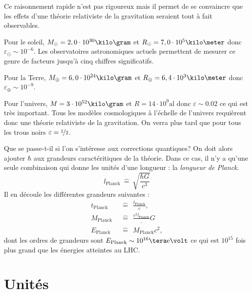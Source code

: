         Ce raisonnement rapide n'est pas rigoureux mais il permet de se convaincre que les effets d'une théorie relativiste de la gravitation seraient tout à fait observables. 
        \begin{exmp}
            Pour le soleil, $M_\odot = 2,0\cdot10^{30}\kilo\gram$ et $R_\odot = 7,0\cdot10^{5}\kilo\meter$ donc $\varepsilon_\odot \sim 10^{-6}$.
            Les observatoires astronomiques actuels permettent de mesurer ce genre de facteurs jusqu'à cinq chiffres significatifs. 
        \end{exmp}
        \begin{exmp}
            Pour la Terre, $M_\oplus= 6,0\cdot10^{24}\kilo\gram$ et $R_\oplus = 6,4\cdot10^{3}\kilo\meter$ donc $ \varepsilon_\oplus\sim 10^{-9}$.
        \end{exmp}
        \begin{exmp}
            Pour l'univers, $M = 3\cdot10^{52}\kilo\gram$ et $R = 14\cdot10^{9}\text{al}$ donc $ \varepsilon\sim 0.02$
            ce qui est très important. Tous les modèles cosmologiques à l'échelle de l'univers requièrent donc une théorie relativiste de la gravitation. On verra plus tard que pour tous les trous noirs $\varepsilon = \nicefrac{1}{2}$.
        \end{exmp}
        
        Que se passe-t-il si l'on s'intéresse aux corrections quantiques? On doit alors ajouter $\hbar$ aux grandeurs caractéritiques de la théorie. Dans ce cas, il n'y a qu'une seule combinaison qui donne les unités d'une longueur : la \textit{longueur de Planck}.
        \begin{equation*}
            l_{\text{Planck}} ~\hat{=}~ \sqrt{\frac{\hbar G}{c^3}}
        \end{equation*}
        Il en découle les différentes grandeurs suivantes :
        \begin{align*}
            t_{\text{Planck}} ~&~\hat{=}~~ \frac{l_{\text{Planck}}}{c}, \\
            M_{\text{Planck}} ~&~\hat{=}~~ \frac{c^2l_{\text{Planck}}},{G} \\
            E_{\text{Planck}} ~&~\hat{=}~~ M_{\text{Planck}}c^2,
        \end{align*}
        dont les ordres de grandeurs sont $E_{\text{Planck}}\sim10^{16}\tera\text{e}\volt$ ce qui est $10^{15}$ fois plus grand que les énergies atteintes au LHC.
        
    \section{Unités}
    
